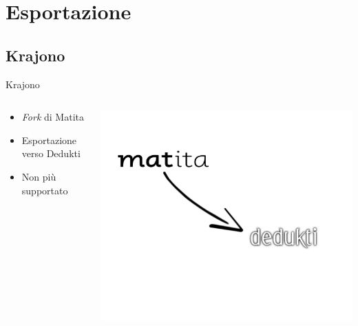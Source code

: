 \documentclass{beamer}
\begin{document}

\section{Esportazione}
\subsection{Krajono}
\begin{frame}{Krajono}

\begin{columns}
\begin{column}{.5\textwidth}
\begin{itemize}
  \item \textit{Fork } di Matita 
  \vspace{1.5em}
  \item Esportazione verso Dedukti
  \vspace{1.5em}
  \item Non più supportato
\end{itemize}
\end{column}
\begin{column}{.5\textwidth}
\includegraphics[scale=0.40]{m2d.png}
\end{column}
\end{columns}

\end{frame}
\end{document}
